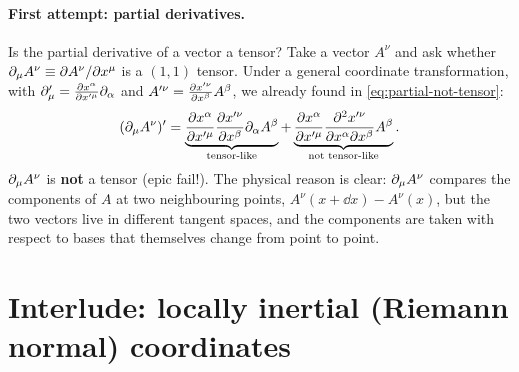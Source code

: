 \paragraph{First attempt: partial derivatives.} Is the partial derivative of a vector a tensor? Take a vector $A^\nu$ and ask whether $\partial_\mu A^\nu\equiv\partial A^\nu/\partial x^\mu$ is a $(1,1)$ tensor. Under a general coordinate transformation, with $\partial'_\mu=\frac{\partial x^\alpha}{\partial x'^\mu}\partial_\alpha$ and $A'^\nu=\frac{\partial x'^\nu}{\partial x^\beta}A^\beta$, we already found in \eqref{eq:partial-not-tensor}:
\begin{equation}
  (\partial_\mu A^\nu)'=\underbrace{\frac{\partial x^\alpha}{\partial x'^\mu}\frac{\partial x'^\nu}{\partial x^\beta}\partial_\alpha A^\beta}_{\text{tensor-like}}
  +\underbrace{\frac{\partial x^\alpha}{\partial x'^\mu}\frac{\partial^2x'^\nu}{\partial x^\alpha\partial x^\beta}A^\beta}_{\text{not tensor-like}} .
\end{equation}
$\partial_\mu A^\nu$ is \textbf{not} a tensor (epic fail!). The physical reason is clear: $\partial_\mu A^\nu$ compares the components of $A$ at two neighbouring points, $A^\nu(x+\dd x)-A^\nu(x)$, but the two vectors live in different tangent spaces, and the components are taken with respect to bases that themselves change from point to point.

\section{Interlude: locally inertial (Riemann normal) coordinates}

